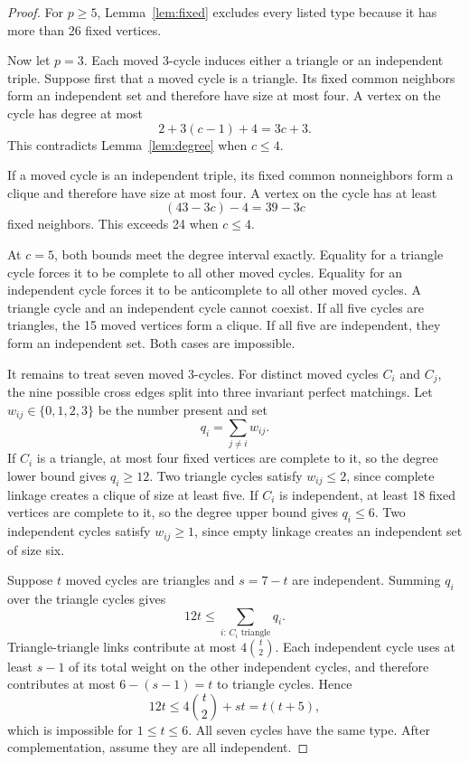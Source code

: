 \documentclass[11pt]{article}
\begin{document}
\begin{proof}
For $p\ge5$, Lemma~\ref{lem:fixed} excludes every listed type because it has
more than 26 fixed vertices.

Now let $p=3$. Each moved 3-cycle induces either a triangle or an independent
triple. Suppose first that a moved cycle is a triangle. Its fixed common
neighbors form an independent set and therefore have size at most four. A
vertex on the cycle has degree at most
\[
2+3(c-1)+4=3c+3.
\]
This contradicts Lemma~\ref{lem:degree} when $c\le4$.

If a moved cycle is an independent triple, its fixed common nonneighbors form
a clique and therefore have size at most four. A vertex on the cycle has at
least
\[
(43-3c)-4=39-3c
\]
fixed neighbors. This exceeds 24 when $c\le4$.

At $c=5$, both bounds meet the degree interval exactly. Equality for a
triangle cycle forces it to be complete to all other moved cycles. Equality
for an independent cycle forces it to be anticomplete to all other moved
cycles. A triangle cycle and an independent cycle cannot coexist. If all
five cycles are triangles, the 15 moved vertices form a clique. If all five
are independent, they form an independent set. Both cases are impossible.

It remains to treat seven moved 3-cycles. For distinct moved cycles $C_i$
and $C_j$, the nine possible cross edges split into three invariant perfect
matchings. Let $w_{ij}\in\{0,1,2,3\}$ be the number present and set
\[
q_i=\sum_{j\ne i}w_{ij}.
\]
If $C_i$ is a triangle, at most four fixed vertices are complete to it, so
the degree lower bound gives $q_i\ge12$. Two triangle cycles satisfy
$w_{ij}\le2$, since complete linkage creates a clique of size at least five.
If $C_i$ is independent, at least 18 fixed vertices are complete to it, so
the degree upper bound gives $q_i\le6$. Two independent cycles satisfy
$w_{ij}\ge1$, since empty linkage creates an independent set of size six.

Suppose $t$ moved cycles are triangles and $s=7-t$ are independent. Summing
$q_i$ over the triangle cycles gives
\[
12t\le \sum_{i:\,C_i\text{ triangle}}q_i.
\]
Triangle-triangle links contribute at most $4\binom{t}{2}$. Each independent
cycle uses at least $s-1$ of its total weight on the other independent
cycles, and therefore contributes at most $6-(s-1)=t$ to triangle cycles.
Hence
\[
12t\le4\binom{t}{2}+st=t(t+5),
\]
which is impossible for $1\le t\le6$. All seven cycles have the same type.
After complementation, assume they are all independent.


\end{proof}
\end{document}
